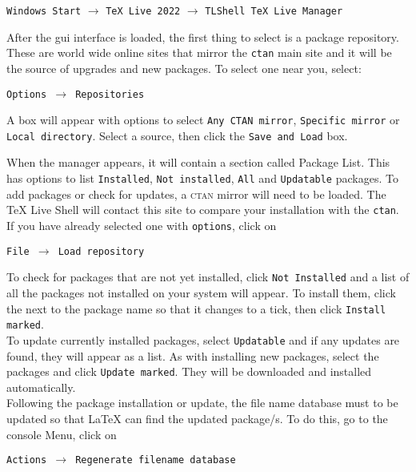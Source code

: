 \documentclass[12pt, a4paper]{article}
\begin{document}
\begin{flushleft}
\texttt{Windows Start} $\rightarrow$ \texttt{TeX Live 2022} $\rightarrow$ \texttt{TLShell TeX Live Manager}
\end{flushleft}

After the gui interface is loaded, the first thing to select is a package repository. These are world wide online sites that mirror the \texttt{ctan} main site and it will be the source of upgrades and new packages. To select one near you, select:

\begin{flushleft}
\texttt{Options $\rightarrow$ Repositories}
\end{flushleft}

A box will appear with options to select \texttt{Any CTAN mirror}, \texttt{Specific mirror} or \texttt{Local directory}. Select a source, then click the \texttt{Save and Load} box.  

When the manager appears, it will contain a section called Package List. This has options to list \texttt{Installed}, \texttt{Not installed}, \texttt{All} and \texttt{Updatable} packages. To add packages or check for updates, a \textsc{ctan} mirror will need to be loaded. The TeX Live Shell will contact this site to compare your installation with the \texttt{ctan}. If you have already selected one with \texttt{options}, click on 

\begin{flushleft}
\texttt{File $\rightarrow$ Load repository}
\end{flushleft}

To check for packages that are not yet installed, click \texttt{Not Installed} and a list of all the packages not installed on your system will appear. To install them, click the \textopenbullet next to the package name so that it changes to a tick, then click \texttt{Install marked}. \\

To update currently installed packages, select \texttt{Updatable} and if any updates are found, they will appear as a list. As with installing new packages, select the packages and click \texttt{Update marked}. They will be downloaded and installed automatically. \\

Following the package installation or update, the file name database must to be updated so that LaTeX can find the updated package/s. To do this, go to the console Menu, click on 


\begin{flushleft}
\texttt{\texttt{Actions $\rightarrow$ Regenerate filename database}}
\end{flushleft}
\end{document}
